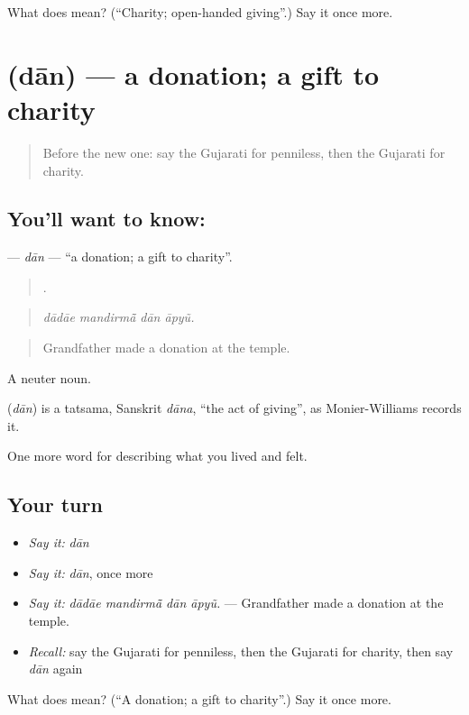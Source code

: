 \begin{tcolorbox}[breakable,colback=teal!4,colframe=teal!35!black,title={Before you move on}]
What does  mean? (\textquotedblleft{}Charity; open-handed giving\textquotedblright{}.) Say it once more.
\end{tcolorbox}
\section[\texorpdfstring{\gu{દાન} (dān)}{દાન (dān)}]{ (dān) — a donation; a gift to charity}

\label{lesson:GU-C461-dan}



\begin{quote}
Before the new one: say the Gujarati for penniless, then the Gujarati for charity.
\end{quote}

\subsection*{You'll want to know: }
\textbf{} — \emph{dān} — \textquotedblleft{}a donation; a gift to charity\textquotedblright{}.

\begin{quote}
   .
\end{quote}

\begin{quote}
\emph{dādāe mandirmā̃ dān āpyũ.}
\end{quote}

\begin{quote}
Grandfather made a donation at the temple.
\end{quote}

A neuter noun.

\begin{cousinweb}
\textbf{} (\emph{dān}) is a tatsama, Sanskrit \emph{dāna}, \textquotedblleft{}the act of giving\textquotedblright{}, as Monier-Williams records it.
\end{cousinweb}

\begin{grammarlens}[title={What you've built}]
One more word for describing what you lived and felt.
\end{grammarlens}

\subsection*{Your turn}
\begin{itemize}
\raggedright
  \item \emph{Say it:} \emph{dān}
  \item \emph{Say it:} \emph{dān}, once more
  \item \emph{Say it:} \emph{dādāe mandirmā̃ dān āpyũ.} — Grandfather made a donation at the temple.
  \item \emph{Recall:} say the Gujarati for penniless, then the Gujarati for charity, then say \emph{dān} again
\end{itemize}

\begin{tcolorbox}[breakable,colback=teal!4,colframe=teal!35!black,title={Before you move on}]
What does  mean? (\textquotedblleft{}A donation; a gift to charity\textquotedblright{}.) Say it once more.
\end{tcolorbox}
